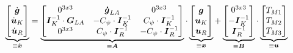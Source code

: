 \begin{equation}
\underbrace{\begin{bmatrix} \dot{\boldsymbol{g}} \\ \dot{\boldsymbol{u}}_K \\ \dot{\boldsymbol{u}}_R \end{bmatrix}}_{\equiv \dot{\boldsymbol{x}}} 
= 
\underbrace{\begin{bmatrix}
0^{3x3} & \boldsymbol{\dot{g}}_{LA} & 0^{3x3} \\
\boldsymbol{I}^{-1}_K \cdot \boldsymbol{G}_{LA} & -C_{\psi}\cdot \boldsymbol{I}^{-1}_K & C_{\psi}\cdot \boldsymbol{I}^{-1}_K \\
0^{3x3} & C_{\psi}\cdot \boldsymbol{I}^{-1}_R & -C_{\psi}\cdot \boldsymbol{I}^{-1}_R
\end{bmatrix}}_{\equiv \boldsymbol{A}}
\cdot
\underbrace{\begin{bmatrix}\boldsymbol{g} \\ \boldsymbol{u}_K \\ \boldsymbol{u}_R\end{bmatrix}}_{\equiv \boldsymbol{x}}
+
\underbrace{\begin{bmatrix}
0^{3x3} \\ -\boldsymbol{I}^{-1}_K \\ \boldsymbol{I}^{-1}_R
\end{bmatrix}}_{\equiv \boldsymbol{B}}
\cdot
\underbrace{\begin{bmatrix}
T_{M1} \\ T_{M2} \\ T_{M3}
\end{bmatrix}}_{\equiv \boldsymbol{u}}
\end{equation}
